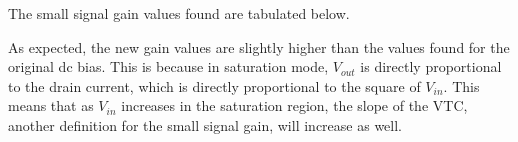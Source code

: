 \FloatBarrier

The small signal gain values found are tabulated below.

\FloatBarrier

\begin{table}[h!]
	\centering
	\caption{Gain of Common Source Amplifier with $10$ \si{\milli\volt} Higher Bias}
	\label{tab:gain_part2}
\end{table}

\FloatBarrier

As expected, the new gain values are slightly higher than the values found for the original dc bias.
This is because in saturation mode, $V_{out}$ is directly proportional to the drain current, which is directly proportional to the square of $V_{in}$. This means that as $V_{in}$ increases in the saturation region, the slope of the VTC, another definition for the small signal gain, will increase as well. \\
